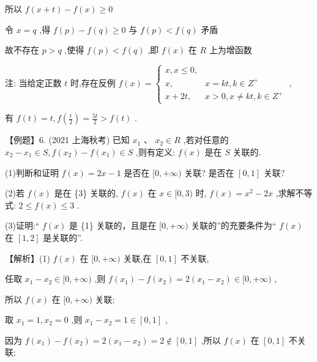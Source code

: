 \documentclass[10pt]{article}
\begin{document}
所以 \(f\left( {x + t}\right)  - f\left( x\right)  \geq  0\)

令 \(x = q\) ,得 \(f\left( p\right)  - f\left( q\right)  \geq  0\) 与 \(f\left( p\right)  < f\left( q\right)\) 矛盾

故不存在 \(p > q\) ,使得 \(f\left( p\right)  < f\left( q\right)\) ,即 \(f\left( x\right)\) 在 \(R\) 上为增函数

注: 当给定正数 \(t\) 时,存在反例 \(f\left( x\right)  = \left\{  \begin{array}{ll} x,x \leq  0, & \\  x, & x = {kt},k \in  {Z}^{ + } \\  x + {2t}, & x > 0,x \neq  {kt},k \in  {Z}^{ + } \end{array}\right.\) ,

有 \(f\left( t\right)  = t,f\left( \frac{t}{2}\right)  = \frac{5t}{2} > f\left( t\right)\) .

【例题】6. (2021 上海秋考) 已知 \({x}_{1}\text{ 、 }{x}_{2} \in  R\) ,若对任意的 \({x}_{2} - {x}_{1} \in  S,f\left( {x}_{2}\right)  - f\left( {x}_{1}\right)  \in  S\) ,则有定义: \(f\left( x\right)\) 是在 \(S\) 关联的.

(1)判断和证明 \(f\left( x\right)  = {2x} - 1\) 是否在 \(\lbrack 0, + \infty )\) 关联? 是否在 \(\left\lbrack  {0,1}\right\rbrack\) 关联?

(2)若 \(f\left( x\right)\) 是在 \{3\} 关联的, \(f\left( x\right)\) 在 \(x \in  \lbrack 0,3)\) 时, \(f\left( x\right)  = {x}^{2} - {2x}\) ,求解不等式: \(2 \leq  f\left( x\right)  \leq  3\) .

(3)证明:“ \(f\left( x\right)\) 是 \{1\} 关联的，且是在 \(\lbrack 0, + \infty )\) 关联的”的充要条件为“ \(f\left( x\right)\) 在 \(\left\lbrack  {1,2}\right\rbrack\) 是关联的”.

【解析】(1) \(f\left( x\right)\) 在 \(\lbrack 0, + \infty )\) 关联,在 \(\left\lbrack  {0,1}\right\rbrack\) 不关联,

任取 \({x}_{1} - {x}_{2} \in  \lbrack 0, + \infty )\) ,则 \(f\left( {x}_{1}\right)  - f\left( {x}_{2}\right)  = 2\left( {{x}_{1} - {x}_{2}}\right)  \in  \lbrack 0, + \infty )\) ,

所以 \(f\left( x\right)\) 在 \(\lbrack 0, + \infty )\) 关联;

取 \({x}_{1} = 1,{x}_{2} = 0\) ,则 \({x}_{1} - {x}_{2} = 1 \in  \left\lbrack  {0,1}\right\rbrack\) ,

因为 \(f\left( {x}_{1}\right)  - f\left( {x}_{2}\right)  = 2\left( {{x}_{1} - {x}_{2}}\right)  = 2 \notin  \left\lbrack  {0,1}\right\rbrack\) ,所以 \(f\left( x\right)\) 在 \(\left\lbrack  {0,1}\right\rbrack\) 不关联;
\end{document}
